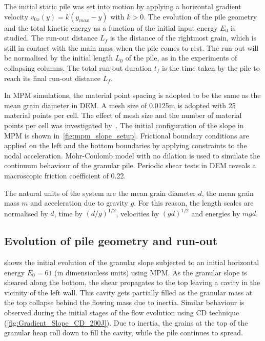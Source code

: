 \documentclass[3p,times,procedia,number]{elsarticle}
\begin{document}
The initial static pile was set into motion by applying a horizontal
gradient velocity $v_{0x}(y) = k (y_{max} - y)$ with $k>0$. The evolution of 
the pile geometry and the total kinetic energy as a function of the initial 
input energy $E_0$ is studied. The run-out distance $L_f$ is the distance of 
the rightmost grain, which is still in contact with the main mass when the pile 
comes to rest. The run-out will be normalised by the initial length $L_0$ of 
the pile, as in the experiments of collapsing columns. The total run-out 
duration $t_f$ is the time taken by the pile to reach its final run-out 
distance $L_f$.

In MPM simulations, the material point spacing is adopted to be the same as the 
mean grain diameter in DEM. A mesh size of 0.0125m is adopted with 25 material 
points per cell. The effect of mesh size and the number of material points per 
cell was investigated by~\citep{soundararajan2015}. The initial configuration
of the slope in MPM is shown in~\cref{fig:mpm_slope_setup}. Frictional boundary
conditions are applied on the left and the bottom boundaries by applying
constraints to the nodal acceleration. Mohr-Coulomb model with no dilation is
used to simulate the continuum behaviour of the granular pile. Periodic shear
tests in DEM reveals a macroscopic friction coefficient of 0.22.

The natural units of the system are the mean grain diameter $d$, the mean grain 
mass $m$ and acceleration due to gravity $g$. For this reason, the length 
scales are normalised by $d$, time by $(d/g)^{1/2}$, velocities by $(gd)^{1/2}$ 
and energies by $mgd$. 

\subsection{Evolution of pile geometry and run-out}
\label{sec:evolution}

 shows the initial evolution of the 
granular slope subjected to an initial horizontal energy $E_0 = 61$ (in 
dimensionless units) using MPM. As the granular slope is sheared along the 
bottom, the shear propagates to the top leaving a cavity in the vicinity of the 
left wall. This cavity gets partially filled as the granular mass at the top 
collapse behind the flowing mass due to inertia. Similar behaviour is observed 
during the initial stages of the flow evolution using CD technique 
(\cref{fig:Gradient_Slope_CD_200J}). Due to inertia, the grains at the top 
of the granular heap roll down to fill the cavity, while the pile continues to 
spread. 
\end{document}
